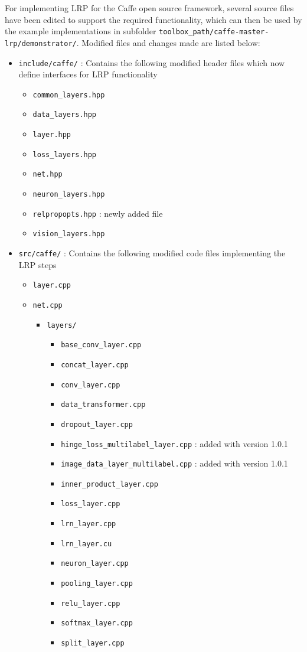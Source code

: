\documentclass[a4wide]{article}
\begin{document}
For implementing LRP for the Caffe open source framework, several source files have been edited to support the required functionality, which can then be used by the example implementations in subfolder \texttt{toolbox\_path/caffe-master-lrp/demonstrator/}. Modified files and changes made are listed below:
\begin{itemize}
\item \texttt{include/caffe/} : Contains the following modified header files which now define interfaces for LRP functionality
\begin{itemize}
	\item \texttt{common\_layers.hpp}
	\item \texttt{data\_layers.hpp}
	\item \texttt{layer.hpp}
	\item \texttt{loss\_layers.hpp}
	\item \texttt{net.hpp}
	\item \texttt{neuron\_layers.hpp}
	\item \texttt{relpropopts.hpp} : newly added file
	\item \texttt{vision\_layers.hpp}
\end{itemize}


\item \texttt{src/caffe/} : Contains the following modified code files implementing the LRP steps
\begin{itemize}
	\item \texttt{layer.cpp}
	\item \texttt{net.cpp}
	\begin{itemize}
		\item \texttt{layers/}
		\begin{itemize}
			\item \texttt{base\_conv\_layer.cpp}
			\item \texttt{concat\_layer.cpp}
			\item \texttt{conv\_layer.cpp}
			\item \texttt{data\_transformer.cpp}
			\item \texttt{dropout\_layer.cpp}
			\item \texttt{hinge\_loss\_multilabel\_layer.cpp} : added with version 1.0.1
			\item \texttt{image\_data\_layer\_multilabel.cpp} : added with version 1.0.1
			\item \texttt{inner\_product\_layer.cpp}
			\item \texttt{loss\_layer.cpp}
			\item \texttt{lrn\_layer.cpp}
			\item \texttt{lrn\_layer.cu}
			\item \texttt{neuron\_layer.cpp}
			\item \texttt{pooling\_layer.cpp}
			\item \texttt{relu\_layer.cpp}
			\item \texttt{softmax\_layer.cpp}
			\item \texttt{split\_layer.cpp}
		\end{itemize}
	\end{itemize}
\end{itemize}


\end{itemize}
\end{document}
